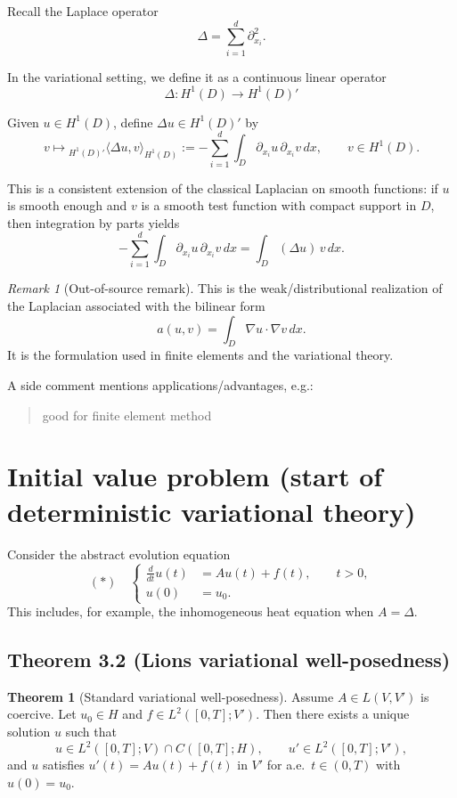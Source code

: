 \documentclass[11pt]{article}
\theoremstyle{definition}
\newtheorem{theorem}{Theorem}
\theoremstyle{remark}
\newtheorem{remark}{Remark}
\begin{document}
Recall the Laplace operator
\[
\Delta = \sum_{i=1}^{d}\partial_{x_i}^2.
\]

In the variational setting, we define it as a continuous linear operator
\[
\Delta: H^1(D)\to H^1(D)'
\]

Given $u\in H^1(D)$, define $\Delta u\in H^1(D)'$ by
\[
v \longmapsto {}_{H^1(D)'}\langle \Delta u,v\rangle_{H^1(D)}
:=
-\sum_{i=1}^{d}\int_D \partial_{x_i}u\,\partial_{x_i}v\,dx,
\qquad v\in H^1(D).
\]

This is a consistent extension of the classical Laplacian on smooth functions: if $u$ is smooth enough and $v$ is a smooth test function with compact support in $D$, then integration by parts yields
\[
-\sum_{i=1}^{d}\int_D \partial_{x_i}u\,\partial_{x_i}v\,dx
=
\int_D (\Delta u)\,v\,dx.
\]

\begin{remark}[Out-of-source remark]
This is the weak/distributional realization of the Laplacian associated with the bilinear form
\[
a(u,v)=\int_D \nabla u\cdot \nabla v\,dx.
\]
It is the formulation used in finite elements and the variational theory.
\end{remark}

A side comment mentions applications/advantages, e.g.:
\begin{quote}
good for finite element method 
\end{quote}

\section*{Initial value problem (start of deterministic variational theory)}

Consider the abstract evolution equation
\[
(*)\quad
\left\{
\begin{aligned}
\frac{d}{dt}u(t) &= Au(t)+f(t), \qquad t>0,\\
u(0) &= u_0.
\end{aligned}
\right.
\]
This includes, for example, the inhomogeneous heat equation when $A=\Delta$.

\subsection*{Theorem 3.2 (Lions variational well-posedness)}

\begin{theorem}[Standard variational well-posedness]
Assume $A\in L(V,V')$ is coercive. Let $u_0\in H$ and $f\in L^2([0,T];V')$. Then there exists a unique solution $u$ such that
\[
u\in L^2([0,T];V)\cap C([0,T];H),
\qquad
u'\in L^2([0,T];V'),
\]
and $u$ satisfies $u'(t)=Au(t)+f(t)$ in $V'$ for a.e.\ $t\in(0,T)$ with $u(0)=u_0$.
\end{theorem}
\end{document}
